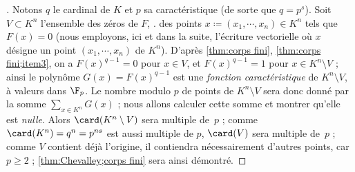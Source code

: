 \documentclass[11pt, %
  title in boldface,
  theorem in new line,
  theorem numbering = section,
  number theorems separately,
  simple name,
]{beaulivre}
\begin{document}
    \begin{proof}[{Démonstration \cref[de]{thm:Chevalley;corps fini}}]
        Notons \( q \) le cardinal de \( K \) et \( p \) sa caractéristique (de sorte que \( q = p^s \)). Soit \( V \subset K^n \) l'ensemble des zéros de \( F \), \ie. des points \( x \coloneqq (x_1, \cdots, x_n) \in K^n \) tels que \( F(x) = 0 \) (nous employons, ici et dans la suite, l'écriture vectorielle où \( x \) désigne un point \( (x_1, \cdots, x_n) \) de \( K^n \)). D'après \cref{thm:corps fini}, \ref{thm:corps fini;item3}, on a \( F(x)^{q-1} = 0 \) pour \( x \in V \), et \( F(x)^{q-1} = 1 \) pour \( x \in K^n \setminus V \) ; ainsi le polynôme \( G(x) = F(x)^{q-1} \) est une \emph{fonction caractéristique} de \( K^n \setminus V \), à valeurs dans \( \F_p \). Le nombre modulo \( p \) de points de \( K^n \setminus V \) sera donc donné par la somme \( \sum_{x \in K^n} G(x) \) ; nous allons calculer cette somme et montrer qu'elle est \emph{nulle}. Alors \( \card(K^n \setminus V) \) sera multiple de~\( p \) ; comme \( \card(K^n) = q^n = p^{ns} \) est aussi multiple de \( p \), \( \card(V) \) sera multiple de~\( p \) ; comme \( V \) contient déjà l'origine, il contiendra nécessairement d'autres points, car \( p \geqslant 2 \) ; \cref{thm:Chevalley;corps fini} sera ainsi démontré.


\end{proof}
\end{document}
